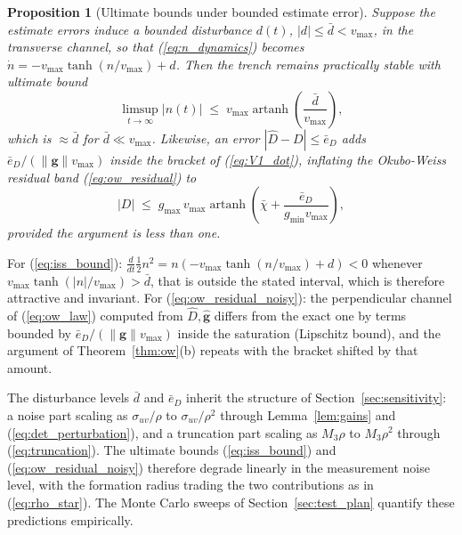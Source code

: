 \documentclass[lettersize,journal]{IEEEtran}
\newtheorem{proposition}{Proposition}
\begin{document}
\begin{proposition}[Ultimate bounds under bounded estimate error]
\label{prop:iss}
Suppose the estimate errors induce a bounded disturbance $d(t)$, $|d|
\leq \bar{d} < v_{\max}$, in the transverse channel, so that
(\ref{eq:n_dynamics}) becomes $\dot{n} = -v_{\max}\tanh(n/v_{\max}) +
d$. Then the trench remains practically stable with ultimate bound
\begin{equation}
    \limsup_{t\to\infty} |n(t)| \;\leq\;
    v_{\max}\operatorname{artanh}\!\left(\frac{\bar{d}}{v_{\max}}\right),
    \label{eq:iss_bound}
\end{equation}
which is $\approx \bar{d}$ for $\bar{d} \ll v_{\max}$. Likewise, an
error $|\hat{D} - D| \leq \bar{e}_D$ adds $\bar{e}_D/(\|\mathbf{g}\|
v_{\max})$ inside the bracket of (\ref{eq:V1_dot}), inflating the
Okubo-Weiss residual band (\ref{eq:ow_residual}) to
\begin{equation}
    |D| \;\leq\; g_{\max}\,v_{\max}
    \operatorname{artanh}\!\left(\bar{\chi} +
    \frac{\bar{e}_D}{g_{\min} v_{\max}}\right),
    \label{eq:ow_residual_noisy}
\end{equation}
provided the argument is less than one.
\end{proposition}

\begin{IEEEproof}
For (\ref{eq:iss_bound}): $\tfrac{d}{dt}\tfrac{1}{2}n^2 = n(-v_{\max}
\tanh(n/v_{\max}) + d) < 0$ whenever $v_{\max}\tanh(|n|/v_{\max}) >
\bar{d}$, that is outside the stated interval, which is therefore
attractive and invariant. For (\ref{eq:ow_residual_noisy}): the
perpendicular channel of (\ref{eq:ow_law}) computed from $\hat{D},
\hat{\mathbf{g}}$ differs from the exact one by terms bounded by
$\bar{e}_D/(\|\mathbf{g}\|v_{\max})$ inside the saturation (Lipschitz
bound), and the argument of Theorem~\ref{thm:ow}(b) repeats with the
bracket shifted by that amount.
\end{IEEEproof}

The disturbance levels $\bar{d}$ and $\bar{e}_D$ inherit the structure
of Section~\ref{sec:sensitivity}: a noise part scaling as
$\sigma_{uv}/\rho$ to $\sigma_{uv}/\rho^2$ through Lemma~\ref{lem:gains}
and (\ref{eq:det_perturbation}), and a truncation part scaling as
$M_3\rho$ to $M_3\rho^2$ through (\ref{eq:truncation}). The ultimate
bounds (\ref{eq:iss_bound}) and (\ref{eq:ow_residual_noisy}) therefore
degrade linearly in the measurement noise level, with the formation
radius trading the two contributions as in (\ref{eq:rho_star}). The
Monte Carlo sweeps of Section~\ref{sec:test_plan} quantify these
predictions empirically.
\end{document}
